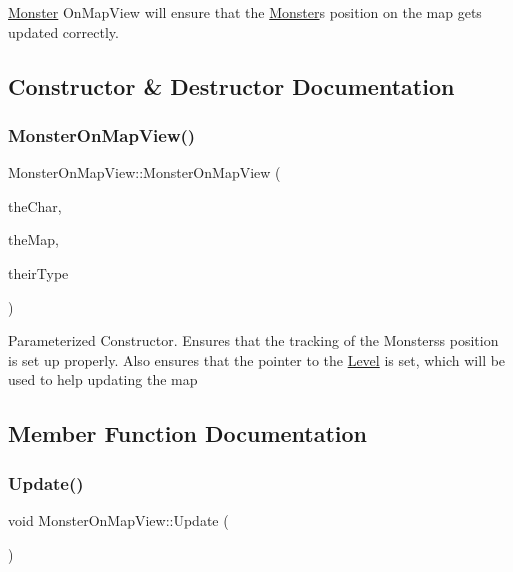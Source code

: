 \hyperlink{class_monster}{Monster} On\+Map\+View will ensure that the \hyperlink{class_monster}{Monster}\textquotesingle{}s position on the map gets updated correctly. 

\subsection{Constructor \& Destructor Documentation}
\hypertarget{class_monster_on_map_view_a52f838a3d411108d54b648879d3174ee}{}\label{class_monster_on_map_view_a52f838a3d411108d54b648879d3174ee} 
\subsubsection{\texorpdfstring{Monster\+On\+Map\+View()}{MonsterOnMapView()}}
{\footnotesize\ttfamily Monster\+On\+Map\+View\+::\+Monster\+On\+Map\+View (\begin{DoxyParamCaption}\item[{\hyperlink{class_characters}{Characters} $\ast$}]{the\+Char,  }\item[{\hyperlink{class_pre_built_level}{Pre\+Built\+Level} $\ast$}]{the\+Map,  }\item[{\hyperlink{namespaces_8h_ad0cd52c7c9b13be13f9aafebd2e1c860}{Character\+Type}}]{their\+Type }\end{DoxyParamCaption})}

Parameterized Constructor. Ensures that the tracking of the Monsters\textquotesingle{}s position is set up properly. Also ensures that the pointer to the \hyperlink{class_level}{Level} is set, which will be used to help updating the map 

\subsection{Member Function Documentation}
\hypertarget{class_monster_on_map_view_a033dc1facbc3fcda212e1f5ed7cd668b}{}\label{class_monster_on_map_view_a033dc1facbc3fcda212e1f5ed7cd668b} 
\subsubsection{\texorpdfstring{Update()}{Update()}}
{\footnotesize\ttfamily void Monster\+On\+Map\+View\+::\+Update (\begin{DoxyParamCaption}{ }\end{DoxyParamCaption})\hspace{0.3cm}{\ttfamily [virtual]}}

